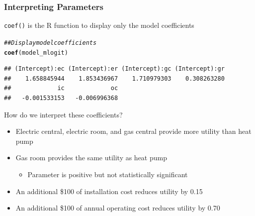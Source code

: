 \documentclass{beamer}\usepackage[]{graphicx}\usepackage[]{xcolor}
\makeatletter
\newcommand{\hlcom}[1]{\textcolor[rgb]{0.678,0.584,0.686}{\textit{#1}}}%
\newcommand{\hlstd}[1]{\textcolor[rgb]{0.345,0.345,0.345}{#1}}%
\newcommand{\hlkwd}[1]{\textcolor[rgb]{0.737,0.353,0.396}{\textbf{#1}}}%
\newenvironment{kframe}{%
 \def\at@end@of@kframe{}%
 \ifinner\ifhmode%
  \def\at@end@of@kframe{\end{minipage}}%
  \begin{minipage}{\columnwidth}%
 \fi\fi%
 \def\FrameCommand##1{\hskip\@totalleftmargin \hskip-\fboxsep
 \colorbox{shadecolor}{##1}\hskip-\fboxsep
     \hskip-\linewidth \hskip-\@totalleftmargin \hskip\columnwidth}%
 \MakeFramed {\advance\hsize-\width
   \@totalleftmargin\z@ \linewidth\hsize
   \@setminipage}}%
 {\par\unskip\endMakeFramed%
 \at@end@of@kframe}
\newenvironment{knitrout}{}{} %
\makeatother
\begin{document}
\begin{frame}[fragile]\frametitle{Interpreting Parameters}
    \texttt{coef()} is the R function to display only the model coefficients
\begin{knitrout}\footnotesize
{}\color{fgcolor}\begin{kframe}
\begin{alltt}
\hlcom{## Display model coefficients}
\hlkwd{coef}\hlstd{(model_mlogit)}
\end{alltt}
\begin{verbatim}
## (Intercept):ec (Intercept):er (Intercept):gc (Intercept):gr 
##    1.658845944    1.853436967    1.710979303    0.308263280 
##             ic             oc 
##   -0.001533153   -0.006996368
\end{verbatim}
\end{kframe}
\end{knitrout}
    \vspace{2ex}
    How do we interpret these coefficients?
    \begin{itemize}
        \item Electric central, electric room, and gas central provide more utility than heat pump
        \item Gas room provides the same utility as heat pump
        \begin{itemize}
        	\item Parameter is positive but not statistically significant
        \end{itemize}
        \item An additional \$100 of installation cost reduces utility by 0.15
        \item An additional \$100 of annual operating cost reduces utility by 0.70
    \end{itemize}
\end{frame}
\end{document}
